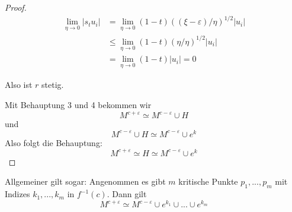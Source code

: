 \begin{proof}
    \begin{align*}
        \lim\limits_{\eta \to 0} | s_t u_i |
           & = \lim\limits_{\eta \to 0} (1 - t)((\xi - \varepsilon)/\eta)^{1/2} | u_i | \\
           & \leq \lim\limits_{\eta \to 0} (1 - t)(\eta/\eta)^{1/2}|u_i| \\
           & = \lim\limits_{\eta \to 0} (1 - t)|u_i| = 0 
    \end{align*}
    
    Also ist $r$ stetig.
    \sectiondone

    Mit Behauptung 3 und 4 bekommen wir
    \[ M^{c + \varepsilon} \simeq M^{c - \varepsilon} \cup H \]
    und 
    \[ M^{c - \varepsilon} \cup H \simeq M^{c - \varepsilon} \cup e^k \]
    Also folgt die Behauptung:
    \[ M^{c + \varepsilon} \simeq H \simeq M^{c - \varepsilon} \cup e^k \]

\end{proof}

\begin{corollary}
    Allgemeiner gilt sogar: Angenommen es gibt $m$ kritische Punkte 
    $p_1, ..., p_m$ mit Indizes $k_1, ..., k_m$ in $f^{-1}(c)$. Dann gilt
    \[ M^{c + \varepsilon} \simeq M^{c - \varepsilon} \cup e^{k_1} \cup ... \cup e^{k_m} \]
\end{corollary}
